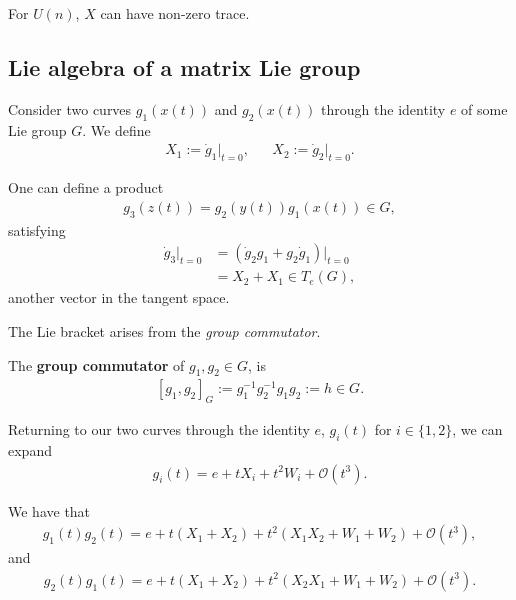 For $U \left( n \right) $, $X$ can have non-zero trace.

\subsection{Lie algebra of a matrix Lie group}

Consider two curves $g_1 \left( x \left( t \right)  \right)$ and $g_2 \left( x \left( t \right)  \right)$ through the identity $e$ of some Lie group $G$. We define
\begin{align}
    X_1 := \dot{g}_1 \bigg|_{t=0}, &&  X_2 := \dot{g}_2 \bigg|_{t=0}
.\end{align}

One can define a product
\begin{align}
    g_3 \left( z\left( t \right)  \right) = g_2\left( y\left( t \right)  \right) g_1 \left( x \left( t \right)  \right) \in G
,\end{align}
satisfying
\begin{align}
    \dot{g}_3 \bigg|_{t=0} &= \left( \dot{g}_2 g_1 + g_2 \dot{g}_1 \right) \bigg|_{t=0}  \\
    &= X_2 + X_1 \in T_e \left( G \right)
,\end{align}
another vector in the tangent space.

The Lie bracket arises from the \textit{group commutator}.

\begin{definition}
    The \textbf{group commutator} of $g_1, g_2 \in G$, is
    \begin{align}
        \left[ g_1, g_2 \right]_{G} := g^{-1}_1 g_2^{-1} g_1 g_2 := h \in G
    .\end{align}
\end{definition}

Returning to our two curves through the identity $e$, $g_i \left( t \right) $ for $i \in \{1,2\} $, we can expand
\begin{align}
    g_i \left( t \right) = e + t X_i + t^2 W_i + \mathcal{O}\left( t^3 \right) 
.\end{align}

We have that
\begin{align}
    g_1 \left( t \right) g_2 \left( t \right) = e + t \left( X_1 + X_2 \right) + t^2 \left( X_1 X_2 + W_1 + W_2 \right) + \mathcal{O}\left( t^3 \right) 
,\end{align}
and
\begin{align}
    g_2 \left( t \right) g_1 \left( t \right) = e + t \left( X_1 + X_2 \right) + t^2 \left( X_2 X_1 + W_1 + W_2 \right) + \mathcal{O}\left( t^3 \right) 
.\end{align}

